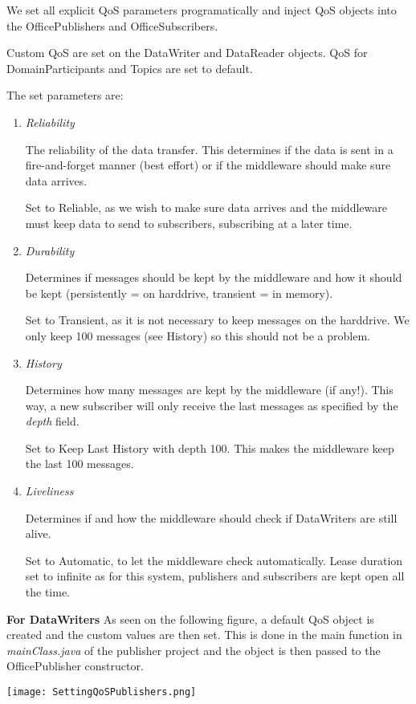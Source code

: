 We set all explicit QoS parameters programatically and inject QoS objects into the OfficePublishers and OfficeSubscribers. 

Custom QoS are set on the DataWriter and DataReader objects. QoS for DomainParticipants and Topics are set to default.

The set parameters are:

\begin{enumerate}
\item \textit{Reliability}

The reliability of the data transfer. This determines if the data is sent in a fire-and-forget manner (best effort) or if the middleware should make sure data arrives.

Set to Reliable, as we wish to make sure data arrives and the middleware must keep data to send to subscribers, subscribing at a later time.

\item \textit{Durability}

Determines if messages should be kept by the middleware and how it should be kept (persistently = on harddrive, transient = in memory).

Set to Transient, as it is not necessary to keep messages on the harddrive. We only keep 100 messages (see History) so this should not be a problem.

\item \textit{History}

Determines how many messages are kept by the middleware (if any!). This way, a new subscriber will only receive the last messages as specified by the \textit{depth} field.

Set to Keep Last History with depth 100. This makes the middleware keep the last 100 messages. 

\item \textit{Liveliness}

Determines if and how the middleware should check if DataWriters are still alive. 

Set to Automatic, to let the middleware check automatically. Lease duration set to infinite as for this system, publishers and subscribers are kept open all the time.

\end{enumerate}

\textbf{For DataWriters}
As seen on the following figure, a default QoS object is created and the custom values are then set. This is done in the main function in \textit{mainClass.java} of the publisher project and the object is then passed to the OfficePublisher constructor.
\begin{center}
	\texttt{[image: SettingQoSPublishers.png]}
\end{center}

